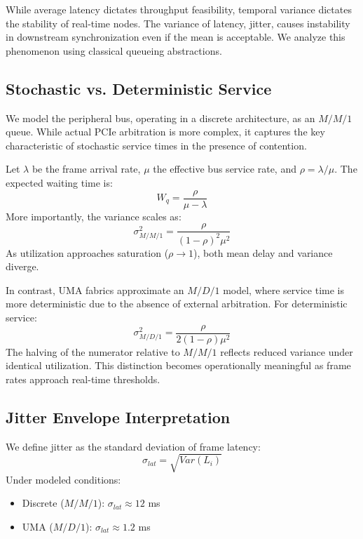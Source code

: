\documentclass[conference]{IEEEtran}
\begin{document}
While average latency dictates throughput feasibility, temporal variance dictates the stability of real-time nodes. The variance of latency, jitter, causes instability in downstream synchronization even if the mean is acceptable. We analyze this phenomenon using classical queueing abstractions.

\subsection{Stochastic vs. Deterministic Service}
We model the peripheral bus, operating in a discrete architecture, as an $M/M/1$ queue. While actual PCIe arbitration is more complex, it captures the key characteristic of stochastic service times in the presence of contention.

Let $\lambda$ be the frame arrival rate, $\mu$ the effective bus service rate, and $\rho = \lambda / \mu$. The expected waiting time is:
\begin{equation}
W_q = \frac{\rho}{\mu - \lambda}
\end{equation}
More importantly, the variance scales as:
\begin{equation}
\sigma^2_{M/M/1} = \frac{\rho}{(1-\rho)^2 \mu^2}
\end{equation}
As utilization approaches saturation ($\rho \to 1$), both mean delay and variance diverge.

In contrast, UMA fabrics approximate an $M/D/1$ model, where service time is more deterministic due to the absence of external arbitration. For deterministic service:
\begin{equation}
\sigma^2_{M/D/1} = \frac{\rho}{2(1-\rho) \mu^2}
\end{equation}
The halving of the numerator relative to $M/M/1$ reflects reduced variance under identical utilization. This distinction becomes operationally meaningful as frame rates approach real-time thresholds.

\subsection{Jitter Envelope Interpretation}
We define jitter as the standard deviation of frame latency:
\begin{equation}
\sigma_{lat} = \sqrt{Var(L_i)}
\end{equation}
Under modeled conditions:
\begin{itemize}
    \item Discrete ($M/M/1$): $\sigma_{lat} \approx 12$ ms
    \item UMA ($M/D/1$): $\sigma_{lat} \approx 1.2$ ms
\end{itemize}
\end{document}
